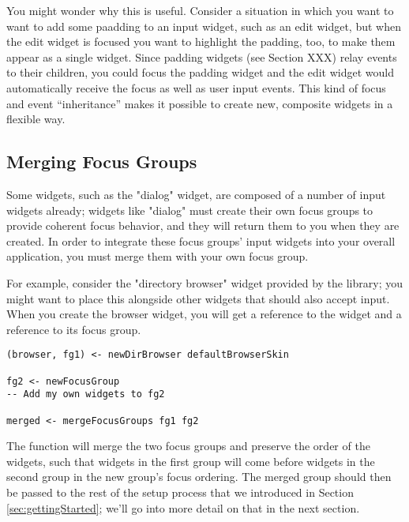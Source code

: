 You might wonder why this is useful.  Consider a situation in which
you want to want to add some paadding to an input widget, such as an
edit widget, but when the edit widget is focused you want to highlight
the padding, too, to make them appear as a single widget.  Since
padding widgets (see Section XXX) relay events to their children, you
could focus the padding widget and the edit widget would automatically
receive the focus as well as user input events.  This kind of focus
and event ``inheritance'' makes it possible to create new, composite
widgets in a flexible way.

\subsection{Merging Focus Groups}

Some widgets, such as the "dialog" widget, are composed of a number of
input widgets already; widgets like "dialog" must create their own
focus groups to provide coherent focus behavior, and they will return
them to you when they are created.  In order to integrate these focus
groups' input widgets into your overall application, you must merge
them with your own focus group.

For example, consider the "directory browser" widget provided by the
library; you might want to place this alongside other widgets that
should also accept input.  When you create the browser widget, you will
get a reference to the widget and a reference to its focus group.

\begin{verbatim}
(browser, fg1) <- newDirBrowser defaultBrowserSkin

fg2 <- newFocusGroup
-- Add my own widgets to fg2

merged <- mergeFocusGroups fg1 fg2
\end{verbatim}

The  function will merge the two focus groups and
preserve the order of the widgets, such that widgets in the first
group will come before widgets in the second group in the new group's
focus ordering.  The merged group should then be passed to the rest of
the setup process that we introduced in Section
\ref{sec:gettingStarted}; we'll go into more detail on that in the
next section.
